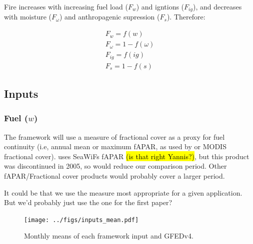 Fire increases with increasing fuel load ($F_w$) and igntions ($F_{ig}$), and decreases with moisture ($F_{\omega}$) and anthropagenic supression ($F_s$). Therefore:

\begin{equation}
    \begin{split}
        F_{w} = f(w) \\
        F_{\omega} = 1 - f(\omega) \\
        F_{ig} = f(ig) \\
        F_{s} = 1- f(s)
    \end{split}
    \label{equ:LimFIRE.x}
\end{equation}




\subsection{Inputs}

\begin{shaded}
\subsubsection{Fuel ($w$)}
The framework will use a measure of fractional cover as a proxy for fuel continuity (i.e, annual mean or maximum fAPAR, as used by \citet{knorr2014impact,knorr2016climate} or MODIS fractional cover). \citet{bistinas2014causal} uses SeaWiFs fAPAR \hl{(is that right Yannis?)}, but this product was discontinued in 2005, so would reduce our comparison period. Other fAPAR/Fractional cover products would probably cover a larger period.


It could be that we use the measure most appropriate for a given application. But we'd probably just use the one for the first paper?
\end{shaded}

\begin{figure}[!ht]
  \centering
    \texttt{[image: ../figs/inputs\_mean.pdf]}
  \caption{Monthly means of each framework input  and GFEDv4.}
  \label{fig:Monthly_mean_ins}
\end{figure}

